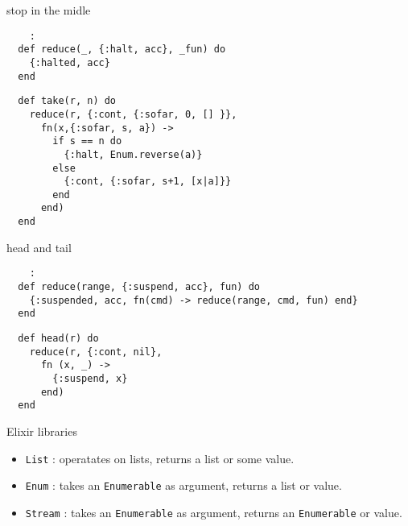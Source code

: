 \begin{frame}[fragile]{stop in the midle}

\begin{verbatim}
    :
  def reduce(_, {:halt, acc}, _fun) do
    {:halted, acc}
  end
\end{verbatim}

\pause
\begin{verbatim}
  def take(r, n) do
    reduce(r, {:cont, {:sofar, 0, [] }},
      fn(x,{:sofar, s, a}) ->
        if s == n do
          {:halt, Enum.reverse(a)}
        else
          {:cont, {:sofar, s+1, [x|a]}}
        end
      end)
  end    
\end{verbatim}
  
  
\end{frame}

\begin{frame}[fragile]{ head and tail }

\begin{verbatim}
    :
  def reduce(range, {:suspend, acc}, fun) do
    {:suspended, acc, fn(cmd) -> reduce(range, cmd, fun) end}
  end
\end{verbatim}
  \pause


\begin{verbatim}
  def head(r) do
    reduce(r, {:cont, nil},
      fn (x, _) ->
        {:suspend, x}
      end)
  end
\end{verbatim}
  
\end{frame}

\begin{frame}{Elixir libraries}

  \begin{itemize}
  \item {\tt List} : operatates on lists, returns a list or some value.  \pause
  \item {\tt Enum} : takes an {\tt Enumerable} as argument, returns a list or value. \pause
  \item {\tt Stream} : takes an {\tt Enumerable} as argument, returns an {\tt Enumerable} or value. 
  \end{itemize}

  \vspace{20pt}
  
\end{frame}


